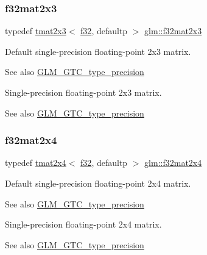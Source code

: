 \subsubsection{\texorpdfstring{f32mat2x3}{f32mat2x3}}
{\footnotesize\ttfamily typedef \hyperlink{structglm_1_1tmat2x3}{tmat2x3}$<$ \hyperlink{group__gtc__type__precision_ga0ec999b57f5330d9021256e96038df04}{f32}, defaultp $>$ \hyperlink{group__gtc__type__precision_gac4573d3d213b2bce23943caef565a211}{glm\+::f32mat2x3}}

Default single-\/precision floating-\/point 2x3 matrix. \begin{DoxySeeAlso}{See also}
\hyperlink{group__gtc__type__precision}{G\+L\+M\+\_\+\+G\+T\+C\+\_\+type\+\_\+precision}
\end{DoxySeeAlso}
Single-\/precision floating-\/point 2x3 matrix. \begin{DoxySeeAlso}{See also}
\hyperlink{group__gtc__type__precision}{G\+L\+M\+\_\+\+G\+T\+C\+\_\+type\+\_\+precision} 
\end{DoxySeeAlso}
\mbox{\label{group__gtc__type__precision_gab0eab14575c18077fd3415539bce685a}} 
\subsubsection{\texorpdfstring{f32mat2x4}{f32mat2x4}}
{\footnotesize\ttfamily typedef \hyperlink{structglm_1_1tmat2x4}{tmat2x4}$<$ \hyperlink{group__gtc__type__precision_ga0ec999b57f5330d9021256e96038df04}{f32}, defaultp $>$ \hyperlink{group__gtc__type__precision_gab0eab14575c18077fd3415539bce685a}{glm\+::f32mat2x4}}

Default single-\/precision floating-\/point 2x4 matrix. \begin{DoxySeeAlso}{See also}
\hyperlink{group__gtc__type__precision}{G\+L\+M\+\_\+\+G\+T\+C\+\_\+type\+\_\+precision}
\end{DoxySeeAlso}
Single-\/precision floating-\/point 2x4 matrix. \begin{DoxySeeAlso}{See also}
\hyperlink{group__gtc__type__precision}{G\+L\+M\+\_\+\+G\+T\+C\+\_\+type\+\_\+precision} 
\end{DoxySeeAlso}
\mbox{\label{group__gtc__type__precision_ga5fbaec59b220964f59403bb362b5f93e}} 
